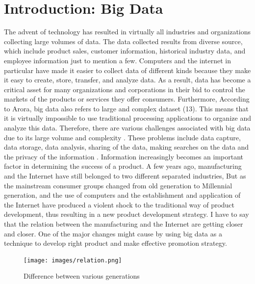 \documentclass[sigconf]{acmart}
\begin{document}
\section{Introduction: Big Data}
The advent of technology has resulted in virtually all industries and organizations collecting large volumes of data. The data collected results from diverse source, which include product sales, customer information, historical industry data, and employee information just to mention a few. Computers and the internet in particular have made it easier to collect data of different kinds because they make it easy to create, store, transfer, and analyze data. As a result, data has become a critical asset for many organizations and corporations in their bid to control the markets of the products or services they offer consumers. Furthermore, According to Arora, big data also refers to large and complex dataset (13). This means that it is virtually impossible to use traditional processing applications to organize and analyze this data. Therefore, there are various challenges associated with big data due to its large volume and complexity \cite{Arora2016}. These problems include data capture, data storage, data analysis, sharing of the data, making searches on the data and the privacy of the information \cite{Sivarajah2017}. Information increasingly becomes an important factor in determining the success of a product. A few years ago, manufacturing and the Internet have still belonged to two different separated industries, But as the mainstream consumer groups changed from old generation to Millennial generation, and the use of computers and the establishment and application of the Internet have produced a violent shock to the traditional way of product development, thus resulting in a new product development strategy. I have to say that the relation between the manufacturing and the Internet are getting closer and closer. One of the major changes might cause by using big data as a technique to develop right product and make effective promotion strategy.
\begin{figure}[!ht]
  \centering\texttt{[image: images/relation.png]}
  \caption{Difference between various generations \cite{part-reg}}
  \label{Figure 3}
\end{figure}
\end{document}
